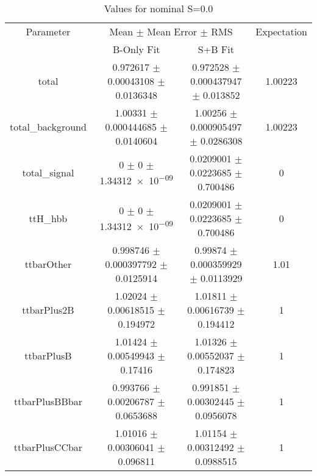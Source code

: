 \begin{table}
\centering
\caption{Values for nominal S=0.0}
\begin{tabular}{cccc}
\toprule
Parameter & \multicolumn{2}{c}{Mean $\pm$ Mean Error $\pm$ RMS} & Expectation\\
 & B-Only Fit & S+B Fit & \\
\midrule
total & \num{0.972617} $\pm$ \num{0.00043108} $\pm$ \num{0.0136348} & \num{0.972528} $\pm$ \num{0.000437947} $\pm$ \num{0.013852} & \num{1.00223}\\
total\_background & \num{1.00331} $\pm$ \num{0.000444685} $\pm$ \num{0.0140604} & \num{1.00256} $\pm$ \num{0.000905497} $\pm$ \num{0.0286308} & \num{1.00223}\\
total\_signal & \num{0} $\pm$ \num{0} $\pm$ \num{1.34312e-09} & \num{0.0209001} $\pm$ \num{0.0223685} $\pm$ \num{0.700486} & \num{0}\\
ttH\_hbb & \num{0} $\pm$ \num{0} $\pm$ \num{1.34312e-09} & \num{0.0209001} $\pm$ \num{0.0223685} $\pm$ \num{0.700486} & \num{0}\\
ttbarOther & \num{0.998746} $\pm$ \num{0.000397792} $\pm$ \num{0.0125914} & \num{0.99874} $\pm$ \num{0.000359929} $\pm$ \num{0.0113929} & \num{1.01}\\
ttbarPlus2B & \num{1.02024} $\pm$ \num{0.00618515} $\pm$ \num{0.194972} & \num{1.01811} $\pm$ \num{0.00616739} $\pm$ \num{0.194412} & \num{1}\\
ttbarPlusB & \num{1.01424} $\pm$ \num{0.00549943} $\pm$ \num{0.17416} & \num{1.01326} $\pm$ \num{0.00552037} $\pm$ \num{0.174823} & \num{1}\\
ttbarPlusBBbar & \num{0.993766} $\pm$ \num{0.00206787} $\pm$ \num{0.0653688} & \num{0.991851} $\pm$ \num{0.00302445} $\pm$ \num{0.0956078} & \num{1}\\
ttbarPlusCCbar & \num{1.01016} $\pm$ \num{0.00306041} $\pm$ \num{0.096811} & \num{1.01154} $\pm$ \num{0.00312492} $\pm$ \num{0.0988515} & \num{1}\\
\bottomrule
\end{tabular}
\end{table}